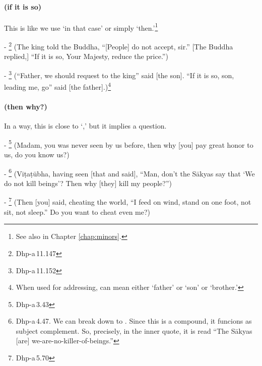 \paragraph*{ (if it is so)} This is like we use `in that case' or simply `then.'\footnote{See also  in Chapter \ref{chap:minors}.} \par
- \footnote{Dhp-a\,11.147} (The king told the Buddha, ``[People] do not accept, sir.'' [The Buddha replied,] ``If it is so, Your Majesty, reduce the price.'')\par
- \footnote{Dhp-a\,11.152} (``Father, we should request to the king'' said [the son]. ``If it is so, son, leading me, go'' said [the father].)\footnote{When used for addressing,  can mean either `father' or `son' or `brother.'}\par

\paragraph*{ (then why?)} In a way, this is close to `,' but it implies a question.\par
- \footnote{Dhp-a\,3.43} (Madam, you was never seen by us before, then why [you] pay great honor to us, do you know us?)\par 
- \footnote{Dhp-a\,4.47. We can break down  to . Since this is a compound, it funcions as subject complement. So, precisely, in the inner quote, it is read ``The S\=akyas [are] we-are-no-killer-of-beings.''} (Vi\d ta\d t\=ubha, having seen [that and said], ``Man, don't the S\=akyas say that `We do not kill beings'? Then why [they] kill my people?'')\par
- \footnote{Dhp-a\,5.70} (Then [you] said, cheating the world, ``I feed on wind, stand on one foot, not sit, not sleep.'' Do you want to cheat even me?)\par

